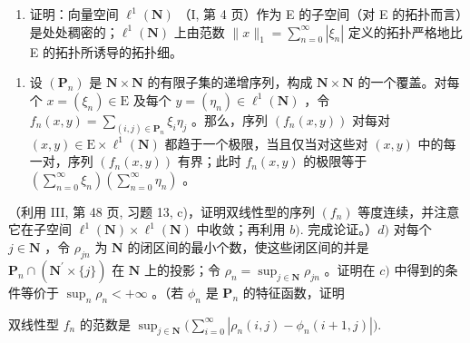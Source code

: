 \begin{enumerate}
\def\labelenumi{\alph{enumi})}
\setcounter{enumi}{1}
\tightlist
\item
  证明：向量空间 \(\ell^1 (\mathbf{N})\) （I, 第 4 页）作为 E 的子空间（对 E 的拓扑而言）是处处稠密的；\(\ell^1 (\mathbf{N})\) 上由范数 \(\| x\| _1 = \sum_{n = 0}^{\infty}|\xi_n|\) 定义的拓扑严格地比 E 的拓扑所诱导的拓扑细。
\end{enumerate}

\begin{enumerate}
\def\labelenumi{\alph{enumi})}
\setcounter{enumi}{2}
\tightlist
\item
  设 \((\mathbf{P}_n)\) 是 \(\mathbf{N} \times \mathbf{N}\) 的有限子集的递增序列，构成 \(\mathbf{N} \times \mathbf{N}\) 的一个覆盖。对每个 \(x = (\xi_n) \in \mathrm{E}\) 及每个 \(y = (\eta_n) \in \ell^1(\mathbf{N})\) ，令 \(f_n(x, y) = \sum_{(i,j) \in \mathbf{P}_n} \xi_i \eta_j\) 。那么，序列 \((f_n(x, y))\) 对每对 \((x, y) \in \mathrm{E} \times \ell^1(\mathbf{N})\) 都趋于一个极限，当且仅当对这些对 \((x, y)\) 中的每一对，序列 \((f_n(x, y))\) 有界；此时 \(f_n(x, y)\) 的极限等于 \(\left(\sum_{n=0}^{\infty} \xi_n\right) \left(\sum_{n=0}^{\infty} \eta_n\right)\) 。
\end{enumerate}

（利用 III, 第 48 页, 习题 13, c)，证明双线性型的序列 \((f_n)\) 等度连续，并注意它在子空间 \(\ell^1 (\mathbf{N})\times \ell^1 (\mathbf{N})\) 中收敛；再利用 \(b).\) 完成论证。）\(d)\) 对每个 \(j\in \mathbf{N}\) ，令 \(\rho_{jn}\) 为 \(\mathbf{N}\) 的闭区间的最小个数，使这些闭区间的并是 \(\mathbf{P}_n\cap (\mathbf{N}^{\prime}\times \{j\})\) 在 \(\mathbf{N}\) 上的投影；令 \(\rho_{n} = \sup_{j\in \mathbf{N}}\rho_{jn}\) 。证明在 \(c)\) 中得到的条件等价于 \(\sup_n\rho_n < + \infty\) 。（若 \(\phi_n\) 是 \(\mathbf{P}_n\) 的特征函数，证明

双线性型 \(f_{n}\) 的范数是 \(\sup_{j\in \mathbf{N}}\big(\sum_{i = 0}^{\infty}|\rho_n(i,j) - \phi_n(i + 1,j)|\big).\)

